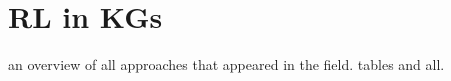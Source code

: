 


\section{RL in KGs}\label{sec:rl-RLinKGs}
an overview of all approaches that appeared in the field. tables and all.



